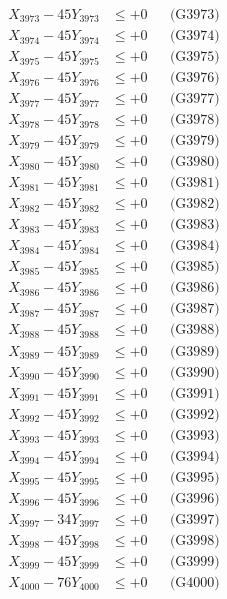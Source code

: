 \documentclass[a4paper,10pt]{article}
\begin{document}
{\begin{align}
X_{3973} - 45Y_{3973} &\leq +0 && \text{(G3973)} \\
X_{3974} - 45Y_{3974} &\leq +0 && \text{(G3974)} \\
X_{3975} - 45Y_{3975} &\leq +0 && \text{(G3975)} \\
X_{3976} - 45Y_{3976} &\leq +0 && \text{(G3976)} \\
X_{3977} - 45Y_{3977} &\leq +0 && \text{(G3977)} \\
X_{3978} - 45Y_{3978} &\leq +0 && \text{(G3978)} \\
X_{3979} - 45Y_{3979} &\leq +0 && \text{(G3979)} \\
X_{3980} - 45Y_{3980} &\leq +0 && \text{(G3980)} \\
\allowbreak
X_{3981} - 45Y_{3981} &\leq +0 && \text{(G3981)} \\
X_{3982} - 45Y_{3982} &\leq +0 && \text{(G3982)} \\
X_{3983} - 45Y_{3983} &\leq +0 && \text{(G3983)} \\
X_{3984} - 45Y_{3984} &\leq +0 && \text{(G3984)} \\
X_{3985} - 45Y_{3985} &\leq +0 && \text{(G3985)} \\
X_{3986} - 45Y_{3986} &\leq +0 && \text{(G3986)} \\
X_{3987} - 45Y_{3987} &\leq +0 && \text{(G3987)} \\
X_{3988} - 45Y_{3988} &\leq +0 && \text{(G3988)} \\
X_{3989} - 45Y_{3989} &\leq +0 && \text{(G3989)} \\
X_{3990} - 45Y_{3990} &\leq +0 && \text{(G3990)} \\
\allowbreak
X_{3991} - 45Y_{3991} &\leq +0 && \text{(G3991)} \\
X_{3992} - 45Y_{3992} &\leq +0 && \text{(G3992)} \\
X_{3993} - 45Y_{3993} &\leq +0 && \text{(G3993)} \\
X_{3994} - 45Y_{3994} &\leq +0 && \text{(G3994)} \\
X_{3995} - 45Y_{3995} &\leq +0 && \text{(G3995)} \\
X_{3996} - 45Y_{3996} &\leq +0 && \text{(G3996)} \\
X_{3997} - 34Y_{3997} &\leq +0 && \text{(G3997)} \\
X_{3998} - 45Y_{3998} &\leq +0 && \text{(G3998)} \\
X_{3999} - 45Y_{3999} &\leq +0 && \text{(G3999)} \\
X_{4000} - 76Y_{4000} &\leq +0 && \text{(G4000)} \\

\end{align}}
\end{document}
